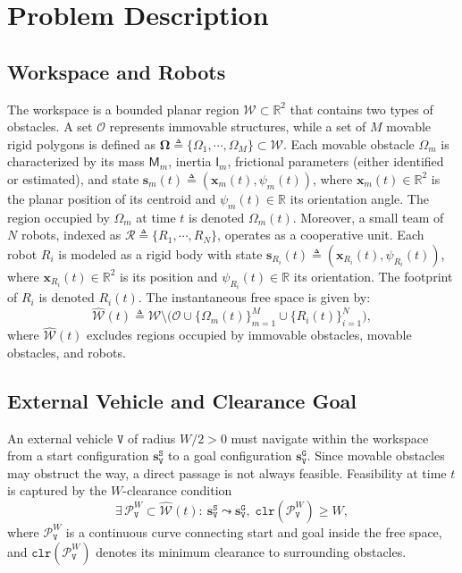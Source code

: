 \section{Problem Description}\label{sec:problem}

\subsection{Workspace and Robots}\label{subsec:ws}
The workspace is a bounded planar region
$\mathcal{W}\subset\mathbb{R}^2$ that contains two types of
obstacles. A set $\mathcal{O}$ represents immovable structures,
while a set of $M$ movable rigid polygons is defined as
$\boldsymbol{\Omega}\triangleq\{\Omega_1,\cdots,\Omega_M\}\subset\mathcal{W}$.
Each movable obstacle $\Omega_m$ is characterized by its mass
$\mathsf{M}_m$, inertia $\mathsf{I}_m$, frictional parameters
(either identified or estimated), and state
$\mathbf{s}_m(t)\triangleq(\mathbf{x}_m(t),\psi_m(t))$,
where $\mathbf{x}_m(t)\in\mathbb{R}^2$ is the planar position of its centroid
and $\psi_m(t)\in\mathbb{R}$ its orientation angle. The region occupied by
$\Omega_m$ at time $t$ is denoted $\Omega_m(t)$.
Moreover, a small team of $N$ robots, indexed as
$\mathcal{R}\triangleq\{R_1,\cdots,R_N\}$, operates as a cooperative unit.
Each robot $R_i$ is modeled as a rigid body with state
$\mathbf{s}_{R_i}(t)\triangleq(\mathbf{x}_{R_i}(t),\psi_{R_i}(t))$,
where $\mathbf{x}_{R_i}(t)\in\mathbb{R}^2$ is its position and
$\psi_{R_i}(t)\in\mathbb{R}$ its orientation. The footprint of $R_i$ is
denoted $R_i(t)$. The instantaneous free space is given by:
\begin{equation}\label{eq:freespace}
\widehat{\mathcal{W}}(t)\triangleq\mathcal{W}\setminus\Big(
\mathcal{O}\cup\{\Omega_m(t)\}_{m=1}^{M}\cup\{R_i(t)\}_{i=1}^{N}
\Big),
\end{equation}
where $\widehat{\mathcal{W}}(t)$ excludes regions occupied by immovable
obstacles, movable obstacles, and robots.

\subsection{External Vehicle and Clearance Goal}\label{subsec:vehicle}
An external vehicle $\texttt{V}$ of radius $W/2>0$ must navigate within the workspace
from a start configuration $\mathbf{s}_\texttt{V}^{\texttt{S}}$ to a goal configuration
$\mathbf{s}_\texttt{V}^{\texttt{G}}$. Since movable obstacles may obstruct the way, a
direct passage is not always feasible. Feasibility at time $t$ is captured by
the $W$-clearance condition
\begin{equation}\label{eq:wclear}
\exists\,\mathcal{P}^W_\texttt{V}\subset\widehat{\mathcal{W}}(t):\
\mathbf{s}_\texttt{V}^{\texttt{S}}\leadsto\mathbf{s}_\texttt{V}^{\texttt{G}},\;
\texttt{clr}(\mathcal{P}^W_\texttt{V})\ge W,
\end{equation}
where $\mathcal{P}^W_\texttt{V}$ is a continuous curve connecting start and goal inside
the free space, and $\texttt{clr}(\mathcal{P}^W_\texttt{V})$ denotes its minimum clearance
to surrounding obstacles.

